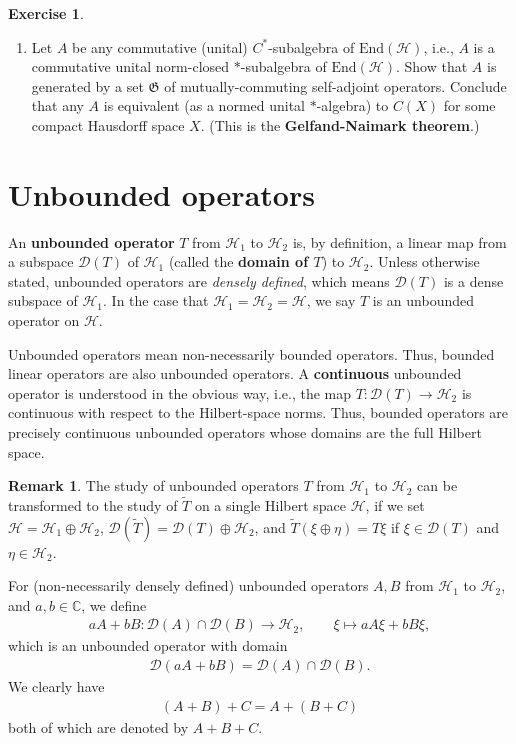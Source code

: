 \documentclass[12pt,b5paper,notitlepage]{article}
\theoremstyle{definition}
\newtheorem{exe}[df]{Exercise}
\newtheorem{rem}[df]{Remark}
\theoremstyle{plain}
\newcommand{\fk}{\mathfrak}
\newcommand{\mc}{\mathcal}
\newcommand{\wtd}{\widetilde}
\newcommand{\End}{\mathrm{End}} %
\newcommand{\Dom}{\scr D}
\newcommand{\scr}{\mathscr}
\newcommand{\Cbb}{\mathbb C}
\numberwithin{equation}{section}
\begin{document}
\begin{exe}
\begin{enumerate}
\item Let $A$ be any commutative (unital) $C^*$-subalgebra of $\End(\mc H)$, i.e., $A$ is a commutative unital norm-closed $*$-subalgebra of $\End(\mc H)$. Show that $A$ is generated by a set $\fk G$ of  mutually-commuting self-adjoint operators. Conclude that any $A$ is equivalent (as a normed unital $*$-algebra) to $C(X)$ for some compact Hausdorff space $X$. (This is the \textbf{Gelfand-Naimark theorem}.)
\end{enumerate}
\end{exe}














\section{Unbounded operators}




An \textbf{unbounded operator} $T$ from $\mc H_1$ to $\mc H_2$ is, by definition, a linear map from a subspace $\scr D(T)$ of $\mc H_1$ (called the \textbf{domain of $T$}) to $\mc H_2$. Unless otherwise stated, unbounded operators are \textit{densely defined}, which means $\Dom(T)$ is a dense subspace of $\mc H_1$. In the case that $\mc H_1=\mc H_2=\mc H$, we say $T$ is an unbounded operator on $\mc H$. 

Unbounded operators mean non-necessarily bounded operators. Thus, bounded linear operators are also unbounded operators. A \textbf{continuous} unbounded operator is understood in the obvious way, i.e., the map $T:\scr D(T)\rightarrow\mc H_2$ is continuous with respect to the Hilbert-space norms. Thus, bounded operators are precisely continuous unbounded operators whose domains are the full Hilbert space.

\begin{rem}
The study of unbounded operators $T$ from $\mc H_1$ to $\mc H_2$ can be transformed to the study of $\wtd T$ on a single Hilbert space $\mc H$, if we set $\mc H=\mc H_1\oplus\mc H_2$, $\scr D(\wtd T)=\scr D(T)\oplus\mc H_2$, and $\wtd T(\xi\oplus\eta)=T\xi$ if $\xi\in\scr D(T)$ and $\eta\in\mc H_2$.
\end{rem}


For (non-necessarily densely defined) unbounded operators $A,B$ from $\mc H_1$ to $\mc H_2$, and $a,b\in\Cbb$, we define
\begin{gather*}
aA+bB:\scr D(A)\cap\scr D(B)\rightarrow\mc H_2,\qquad \xi\mapsto aA\xi+bB\xi,	
\end{gather*}
which is an unbounded operator with domain
\begin{align*}
\scr D(aA+bB)=\scr D(A)\cap\scr D(B).
\end{align*}
We clearly have
\begin{align*}
(A+B)+C=A+(B+C)
\end{align*}
both of which are denoted by $A+B+C$.
\end{document}

